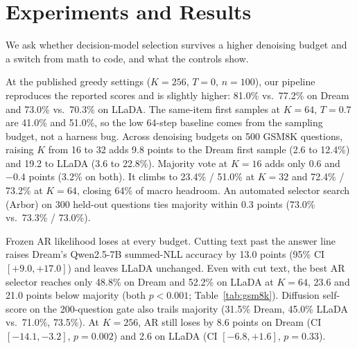\section{Experiments and Results}
\label{sec:experiments}

We ask whether decision-model selection survives a higher denoising budget and a switch from math to code, and what the controls show.

At the published greedy settings ($K=256$, $T=0$, $n=100$), our pipeline reproduces the reported scores and is slightly higher: 81.0\% vs.\ 77.2\% on Dream and 73.0\% vs.\ 70.3\% on LLaDA. The same-item first samples at $K=64$, $T=0.7$ are 41.0\% and 51.0\%, so the low 64-step baseline comes from the sampling budget, not a harness bug. Across denoising budgets on 500 GSM8K questions, raising $K$ from 16 to 32 adds 9.8 points to the Dream first sample (2.6 to 12.4\%) and 19.2 to LLaDA (3.6 to 22.8\%). Majority vote at $K=16$ adds only 0.6 and $-0.4$ points (3.2\% on both). It climbs to 23.4\% / 51.0\% at $K=32$ and 72.4\% / 73.2\% at $K=64$, closing 64\% of macro headroom. An automated selector search (Arbor) on 300 held-out questions ties majority within 0.3 points (73.0\% vs.\ 73.3\% / 73.0\%).

Frozen AR likelihood loses at every budget. Cutting text past the answer line raises Dream's Qwen2.5-7B summed-NLL accuracy by 13.0 points (95\% CI $[+9.0,+17.0]$) and leaves LLaDA unchanged. Even with cut text, the best AR selector reaches only 48.8\% on Dream and 52.2\% on LLaDA at $K=64$, 23.6 and 21.0 points below majority (both $p<0.001$; Table~\ref{tab:gsm8k}). Diffusion self-score on the 200-question gate also trails majority (31.5\% Dream, 45.0\% LLaDA vs.\ 71.0\%, 73.5\%). At $K=256$, AR still loses by 8.6 points on Dream (CI $[-14.1,-3.2]$, $p=0.002$) and 2.6 on LLaDA (CI $[-6.8,+1.6]$, $p=0.33$).

